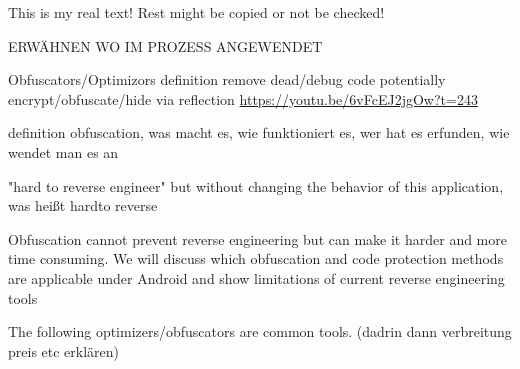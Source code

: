 This is my real text! Rest might be copied or not be checked!

ERWÄHNEN WO IM PROZESS ANGEWENDET\newline


Obfuscators/Optimizors definition\newline
remove dead/debug code\newline
potentially encrypt/obfuscate/hide via reflection\newline
\url{https://youtu.be/6vFcEJ2jgOw?t=243}\newline

definition obfuscation, was macht es, wie funktioniert es, wer hat es erfunden, wie wendet man es an\newline

"hard to reverse engineer" but without changing the behavior of this
application, was heißt hardto reverse\newline

Obfuscation cannot prevent reverse engineering but can make it harder and more time consuming. We will discuss which obfuscation and code protection methods are applicable under Android and show limitations of current reverse engineering tools\newline

The following optimizers/obfuscators are common tools. (dadrin dann verbreitung preis etc erklären)
